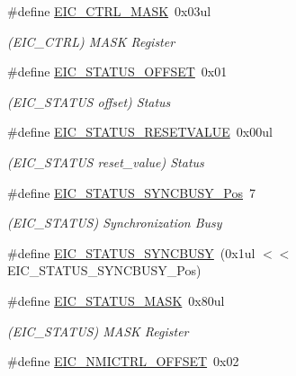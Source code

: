 \begin{DoxyCompactItemize}
\item 
\#define \mbox{\hyperlink{group___s_a_m_d21___e_i_c_ga7e5ab886f4192989cf55304ed358e3a6}{E\+I\+C\+\_\+\+C\+T\+R\+L\+\_\+\+M\+A\+SK}}~0x03ul
\begin{DoxyCompactList}\small\item\em (E\+I\+C\+\_\+\+C\+T\+RL) M\+A\+SK Register \end{DoxyCompactList}\item 
\#define \mbox{\hyperlink{group___s_a_m_d21___e_i_c_gaa1d6b3e57648f82b7ec4f6789fa434e1}{E\+I\+C\+\_\+\+S\+T\+A\+T\+U\+S\+\_\+\+O\+F\+F\+S\+ET}}~0x01
\begin{DoxyCompactList}\small\item\em (E\+I\+C\+\_\+\+S\+T\+A\+T\+US offset) Status \end{DoxyCompactList}\item 
\#define \mbox{\hyperlink{group___s_a_m_d21___e_i_c_ga4532e4f07ef6eccb30714dd24698b971}{E\+I\+C\+\_\+\+S\+T\+A\+T\+U\+S\+\_\+\+R\+E\+S\+E\+T\+V\+A\+L\+UE}}~0x00ul
\begin{DoxyCompactList}\small\item\em (E\+I\+C\+\_\+\+S\+T\+A\+T\+US reset\+\_\+value) Status \end{DoxyCompactList}\item 
\#define \mbox{\hyperlink{group___s_a_m_d21___e_i_c_gacd0b3a3c3852e2f6be475f2284d4fabd}{E\+I\+C\+\_\+\+S\+T\+A\+T\+U\+S\+\_\+\+S\+Y\+N\+C\+B\+U\+S\+Y\+\_\+\+Pos}}~7
\begin{DoxyCompactList}\small\item\em (E\+I\+C\+\_\+\+S\+T\+A\+T\+US) Synchronization Busy \end{DoxyCompactList}\item 
\#define \mbox{\hyperlink{group___s_a_m_d21___e_i_c_ga6794d69c63eac731887e5734b821d1f0}{E\+I\+C\+\_\+\+S\+T\+A\+T\+U\+S\+\_\+\+S\+Y\+N\+C\+B\+U\+SY}}~(0x1ul $<$$<$ E\+I\+C\+\_\+\+S\+T\+A\+T\+U\+S\+\_\+\+S\+Y\+N\+C\+B\+U\+S\+Y\+\_\+\+Pos)
\item 
\#define \mbox{\hyperlink{group___s_a_m_d21___e_i_c_gaec28f4f25de8375cb9ec6e4b9bd85337}{E\+I\+C\+\_\+\+S\+T\+A\+T\+U\+S\+\_\+\+M\+A\+SK}}~0x80ul
\begin{DoxyCompactList}\small\item\em (E\+I\+C\+\_\+\+S\+T\+A\+T\+US) M\+A\+SK Register \end{DoxyCompactList}\item 
\#define \mbox{\hyperlink{group___s_a_m_d21___e_i_c_ga955df6174347427aaaed840874fa273f}{E\+I\+C\+\_\+\+N\+M\+I\+C\+T\+R\+L\+\_\+\+O\+F\+F\+S\+ET}}~0x02
$$
\end{DoxyCompactItemize}
